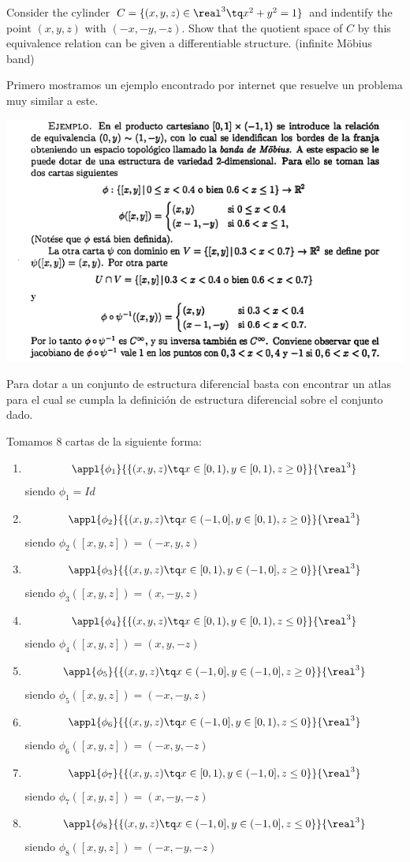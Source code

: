 \begin{problem}[6]
Consider the cylinder $C=\{(x,y,z) \in \real^3 \tq x^2+y^2=1\}$ and indentify the point $(x,y,z)$ with $(-x,-y,-z)$. Show that the quotient space of $C$ by this equivalence relation can be given a differentiable structure. (infinite Möbius band)
\solution


Primero mostramos un ejemplo encontrado por internet que resuelve un problema muy similar a este.

\begin{center}
\includegraphics[keepaspectratio=true,width=\linewidth]{img/ejemplo_6.png}
\end{center}

Para dotar a un conjunto de estructura diferencial basta con encontrar un atlas para el cual se cumpla la definición de estructura diferencial sobre el conjunto dado.

Tomamos 8 cartas de la siguiente forma:
\begin{enumerate}
\item
\[\appl{\phi_1}{\{(x,y,z) \tq x\in [0,1), y \in [0,1), z \geq 0\}}{\real^3}\]
siendo $\phi_1=Id$
\item
\[\appl{\phi_2}{\{(x,y,z) \tq x\in (-1,0], y \in [0,1), z \geq 0\}}{\real^3}\]
siendo $\phi_2([x,y,z])=(-x,y,z)$
\item
\[\appl{\phi_3}{\{(x,y,z) \tq x\in [0,1), y \in (-1,0], z \geq 0\}}{\real^3}\]
siendo $\phi_3([x,y,z])=(x,-y,z)$
\item
\[\appl{\phi_4}{\{(x,y,z) \tq x\in [0,1), y \in [0,1), z \leq 0\}}{\real^3}\]
siendo $\phi_4([x,y,z])=(x,y,-z)$
\item
\[\appl{\phi_5}{\{(x,y,z) \tq x\in (-1,0], y \in (-1,0], z \geq 0\}}{\real^3}\]
siendo $\phi_5([x,y,z])=(-x,-y,z)$
\item
\[\appl{\phi_6}{\{(x,y,z) \tq x\in (-1,0], y \in [0,1), z \leq 0\}}{\real^3}\]
siendo $\phi_6([x,y,z])=(-x,y,-z)$
\item
\[\appl{\phi_7}{\{(x,y,z) \tq x\in [0,1), y \in (-1,0], z \leq 0\}}{\real^3}\]
siendo $\phi_7([x,y,z])=(x,-y,-z)$
\item
\[\appl{\phi_8}{\{(x,y,z) \tq x\in (-1,0], y \in (-1,0], z \leq 0\}}{\real^3}\]
siendo $\phi_8([x,y,z])=(-x,-y,-z)$


\end{enumerate}
\end{problem}
